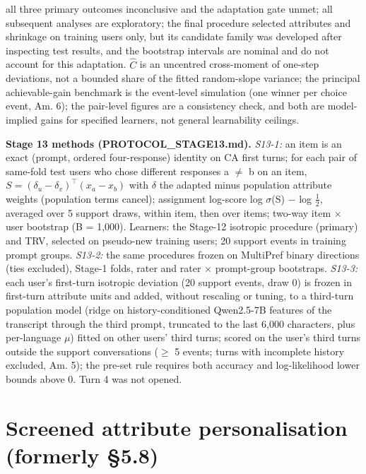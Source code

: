 \documentclass{article}
\begin{document}
all three primary outcomes inconclusive and the adaptation gate unmet; all subsequent analyses are exploratory; the final procedure selected attributes and shrinkage on training users only, but its candidate family was developed after inspecting test results, and the bootstrap intervals are nominal and do not account for this adaptation. $\hat C$ is an uncentred cross-moment of one-step deviations, not a bounded share of the fitted random-slope variance; the principal achievable-gain benchmark is the event-level simulation (one winner per choice event, Am. 6); the pair-level figures are a consistency check, and both are model-implied gains for specified learners, not general learnability ceilings.

\textbf{Stage 13 methods (PROTOCOL\_STAGE13.md).} \emph{S13-1:} an item is an exact (prompt, ordered four-response) identity on CA first turns; for each pair of same-fold test users who chose different responses a $\neq$ b on an item, \(S = (\delta_u - \delta_v)^\top (x_a - x_b)\) with $\delta$ the adapted minus population attribute weights (population terms cancel); assignment log-score log $\sigma$(S) $-$ log $\tfrac12$, averaged over 5 support draws, within item, then over items; two-way item $\times$ user bootstrap (B = 1,000). Learners: the Stage-12 isotropic procedure (primary) and TRV, selected on pseudo-new training users; 20 support events in training prompt groups. \emph{S13-2:} the same procedures frozen on MultiPref binary directions (ties excluded), Stage-1 folds, rater and rater $\times$ prompt-group bootstraps. \emph{S13-3:} each user's first-turn isotropic deviation (20 support events, draw 0) is frozen in first-turn attribute units and added, without rescaling or tuning, to a third-turn population model (ridge on history-conditioned Qwen2.5-7B features of the transcript through the third prompt, truncated to the last 6,000 characters, plus per-language $\mu$) fitted on other users' third turns; scored on the user's third turns outside the support conversations ($\geq$ 5 events; turns with incomplete history excluded, Am. 5); the pre-set rule requires both accuracy and log-likelihood lower bounds above 0. Turn 4 was not opened.

\section{Screened attribute personalisation (formerly \S{}5.8)}
\end{document}
